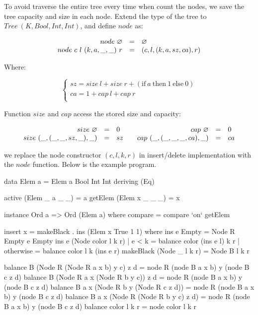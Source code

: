 \documentclass[b5paper]{article}
\begin{document}
\begin{Answer}[ref = {ex:mark-rebuild}]
{To avoid traverse the entire tree every time when count the nodes, we save the tree capacity and size in each node. Extend the type of the tree to $Tree\ (K, Bool, Int, Int)$, and define $node$ as:

\[
\begin{array}{rcl}
node\ \varnothing & = & \varnothing \\
node\ c\ l\ (k, a, \_, \_)\ r & = & (c, l, (k, a, sz, ca), r) \\
\end{array}
\]

Where:

\[
\begin{cases}
sz = size\ l + size\ r + (\text{if}\ a\ \text{then}\ 1\ \text{else}\ 0) \\
ca = 1 + cap\ l + cap\ r \\
\end{cases}
\]

Function $size$ and $cap$ access the stored size and capacity:

\[
\begin{array}{cc}
  \begin{array}{rcl}
  size\ \varnothing & = & 0 \\
  size\ (\_, (\_, \_, sz, \_), \_) & = & sz \\
  \end{array}
&
  \begin{array}{rcl}
  cap\ \varnothing & = & 0 \\
  cap\ (\_, (\_, \_, \_, ca), \_) & = & ca \\
  \end{array}
\end{array}
\]

we replace the node constructor $(c, l, k, r)$ in insert/delete implementation with the $node$ function. Below is the example program.

\begin{Haskell}
data Elem a = Elem a Bool Int Int deriving (Eq)

active (Elem _ a _ _) = a
getElem (Elem x _ _ _) = x

instance Ord a => Ord (Elem a) where
  compare = compare `on` getElem

insert x = makeBlack . ins (Elem x True 1 1) where
    ins e Empty = Node R Empty e Empty
    ins e (Node color l k r)
        | e < k     = balance color (ins e l) k r
        | otherwise = balance color l k (ins e r)
    makeBlack (Node _ l k r) = Node B l k r

balance B (Node R (Node R a x b) y c) z d = node R (node B a x b) y (node B c z d)
balance B (Node R a x (Node R b y c)) z d = node R (node B a x b) y (node B c z d)
balance B a x (Node R b y (Node R c z d)) = node R (node B a x b) y (node B c z d)
balance B a x (Node R (Node R b y c) z d) = node R (node B a x b) y (node B c z d)
balance color l k r = node color l k r


\end{Haskell}}
\end{Answer}
\end{document}
